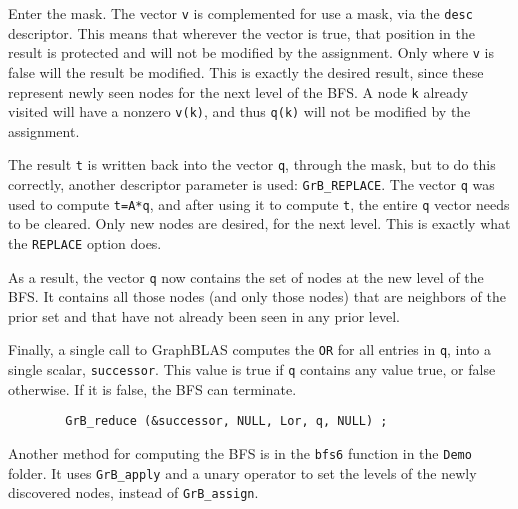 \documentclass[12pt]{article}
\begin{document}
Enter the mask.  The vector \verb'v' is complemented for use a mask, via the
\verb'desc' descriptor.  This means that wherever the vector is true, that
position in the result is protected and will not be modified by the assignment.
Only where \verb'v' is false will the result be modified.  This is exactly the
desired result, since these represent newly seen nodes for the next level of
the BFS.  A node \verb'k' already visited will have a nonzero \verb'v(k)', and
thus \verb'q(k)' will not be modified by the assignment.

The result \verb't' is written back into the vector \verb'q', through the mask,
but to do this correctly, another descriptor parameter is used:
\verb'GrB_REPLACE'.  The vector \verb'q' was used to compute \verb't=A*q', and
after using it to compute \verb't', the entire \verb'q' vector needs to be
cleared.  Only new nodes are desired, for the next level.  This is exactly what
the \verb'REPLACE' option does.

As a result, the vector \verb'q' now contains the set of nodes at the new
level of the BFS.  It contains all those nodes (and only those nodes)
that are neighbors of the prior set and that have not already been seen in
any prior level.

Finally, a single call to GraphBLAS computes the \verb'OR' for all entries
in \verb'q', into a single scalar, \verb'successor'.  This value is true if
\verb'q' contains any value true, or false otherwise.  If it is false,
the BFS can terminate.

        {\footnotesize
        \begin{verbatim}
        GrB_reduce (&successor, NULL, Lor, q, NULL) ; \end{verbatim}}

Another method for computing the BFS is in the \verb'bfs6' function in the
\verb'Demo' folder.  It uses \verb'GrB_apply' and a unary operator to set the
levels of the newly discovered nodes, instead of
\verb'GrB_assign'.
\end{document}
